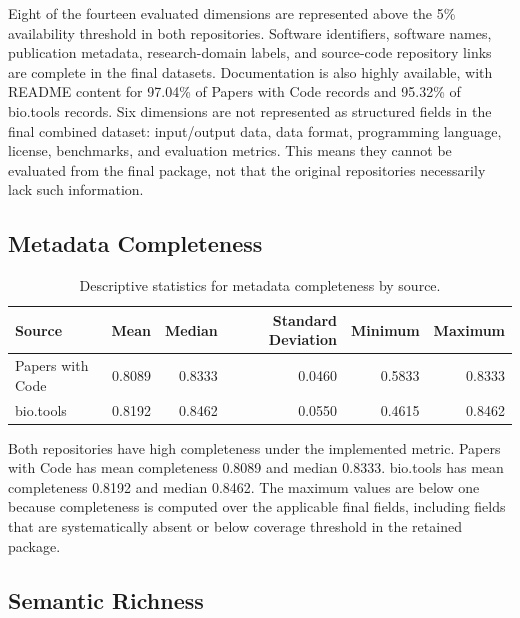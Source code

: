 \documentclass[pdflatex,sn-mathphys-num]{sn-jnl}%
\theoremstyle{thmstyleone}%
\theoremstyle{thmstyletwo}%
\theoremstyle{thmstylethree}%
\begin{document}
Eight of the fourteen evaluated dimensions are represented above the 5\% availability threshold in both repositories. Software identifiers, software names, publication metadata, research-domain labels, and source-code repository links are complete in the final datasets. Documentation is also highly available, with README content for 97.04\% of Papers with Code records and 95.32\% of bio.tools records. Six dimensions are not represented as structured fields in the final combined dataset: input/output data, data format, programming language, license, benchmarks, and evaluation metrics. This means they cannot be evaluated from the final package, not that the original repositories necessarily lack such information.

\subsection{Metadata Completeness}
\label{subsec:semantic-completeness}

\begin{table}[htbp]
\centering
\small
\caption{Descriptive statistics for metadata completeness by source.}
\label{tab:semantic-completeness-descriptive-statistics}
\begin{tabular}{lrrrrr}
\toprule
Source & Mean & Median & Standard Deviation & Minimum & Maximum \\
\midrule
Papers with Code & 0.8089 & 0.8333 & 0.0460 & 0.5833 & 0.8333 \\
bio.tools & 0.8192 & 0.8462 & 0.0550 & 0.4615 & 0.8462 \\
\bottomrule
\end{tabular}
\end{table}

Both repositories have high completeness under the implemented metric. Papers with Code has mean completeness 0.8089 and median 0.8333. bio.tools has mean completeness 0.8192 and median 0.8462. The maximum values are below one because completeness is computed over the applicable final fields, including fields that are systematically absent or below coverage threshold in the retained package.

\subsection{Semantic Richness}
\label{subsec:semantic-richness}
\end{document}
